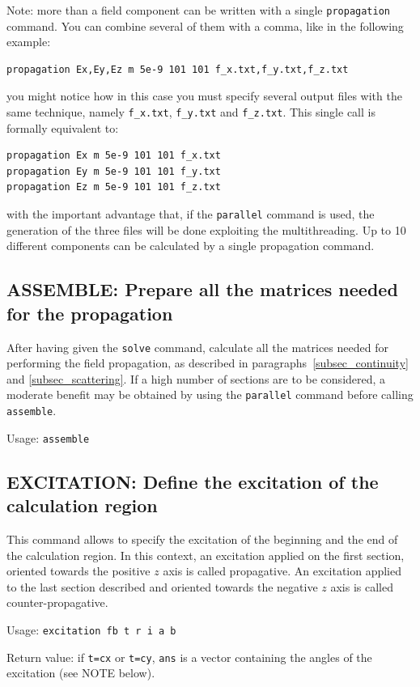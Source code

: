 Note: more than a field component can be written with a single \lstinline!propagation! command. You can combine several of them with a comma, like in the following example:
\begin{lstlisting}
propagation Ex,Ey,Ez m 5e-9 101 101 f_x.txt,f_y.txt,f_z.txt
\end{lstlisting}
you might notice how in this case you must specify several output files with the same technique, namely \lstinline!f_x.txt!, \lstinline!f_y.txt! and \lstinline!f_z.txt!. This single call is formally equivalent to:
\begin{lstlisting}
propagation Ex m 5e-9 101 101 f_x.txt
propagation Ey m 5e-9 101 101 f_y.txt
propagation Ez m 5e-9 101 101 f_z.txt
\end{lstlisting}
with the important advantage that, if the \lstinline!parallel! command is used, the generation of the three files will be done exploiting the multithreading. Up to 10 different components can be calculated by a single propagation command.
    
\subsection{ASSEMBLE: Prepare all the matrices needed for the propagation}
\label{subsec_assemble}
    After having given the \lstinline!solve! command, calculate all the matrices needed for performing the field propagation, as described in paragraphs~\ref{subsec_continuity} and \ref{subsec_scattering}. If a high number of sections are to be considered, a moderate benefit may be obtained by using the \lstinline!parallel! command before calling \lstinline!assemble!.
    
    Usage: \lstinline!assemble!
    
\subsection{EXCITATION: Define the excitation of the calculation region}
    This command allows to specify the excitation of the beginning and
    the end of the calculation region. In this context, an excitation applied on the first section, oriented towards the positive $z$ axis is called propagative.  An excitation applied to the last section described and oriented towards the negative $z$ axis is called counter-propagative.

    Usage: \lstinline!excitation fb t r i a b!
    
    Return value: if \lstinline!t=cx! or \lstinline!t=cy!, \lstinline!ans! is a vector containing the angles of the excitation (see NOTE below).    
    

